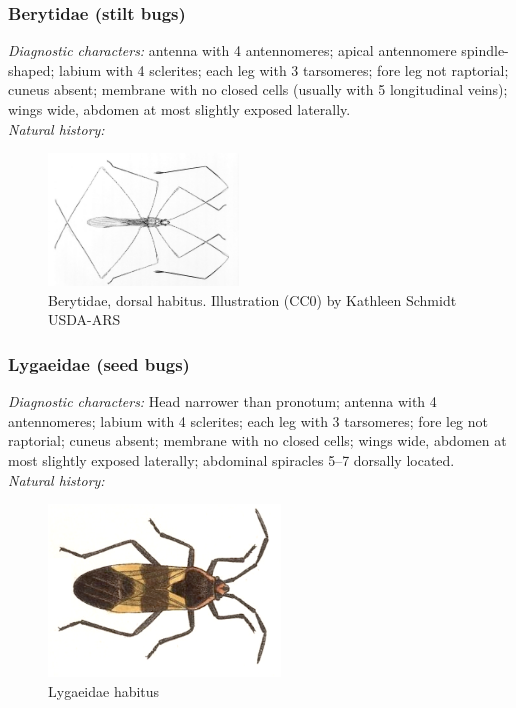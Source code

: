 \documentclass[letterpaper, 11pt]{article}
\begin{document}
\subsubsection{Berytidae (stilt bugs)}
\noindent{}\textit{Diagnostic characters:} antenna with 4 antennomeres; apical antennomere spindle-shaped; labium with 4 sclerites; each leg with 3 tarsomeres; fore leg not raptorial; cuneus absent; membrane with no closed cells (usually with 5 longitudinal veins); wings wide, abdomen at most slightly exposed laterally.\\

\noindent{}\textit{Natural history:} \\

\begin{figure}[ht!]
 \centering
 \includegraphics[width=0.45\textwidth]{BerytidHabitus}
 \caption{Berytidae, dorsal habitus. Illustration (CC0) by Kathleen Schmidt USDA-ARS}
 \label{fig:berytid1}
\end{figure}

\subsubsection{Lygaeidae (seed bugs)}
\noindent{}\textit{Diagnostic characters:} Head narrower than pronotum; antenna with 4 antennomeres; labium with 4 sclerites; each leg with 3 tarsomeres; fore leg not raptorial; cuneus absent; membrane with no closed cells; wings wide, abdomen at most slightly exposed laterally; abdominal spiracles 5--7 dorsally located.\\

\noindent{}\textit{Natural history:} \\

\begin{figure}[ht!]
 \centering
 \includegraphics[width=0.55\textwidth]{LygaeidHabitus}
 \caption{Lygaeidae habitus \citep[][Plate 16, Fig. 23]{bhl14630}}
 \label{fig:lygaeid1}
\end{figure}
\end{document}
